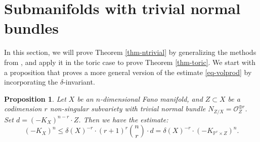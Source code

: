 \documentclass[12pt]{amsart}
\newtheorem{thm}{Theorem}[section]
\newtheorem{prop}[thm]{Proposition}
\theoremstyle{definition}
\newcommand{\IP}{{\mathbb P}}
\newcommand{\CO}{{\mathcal O}}
\newcommand{\lee}{\leqslant}
\begin{document}
\section{Submanifolds with trivial normal bundles}\label{sec-ntrivial}


In this section, we will prove Theorem \ref{thm-ntrivial} by generalizing the methods from \cite{Fuj18, LZ18}, and apply it in the toric case to prove Theorem \ref{thm-toric}.
We start with a proposition that proves a more general version of the estimate \eqref{eq-volprod} by incorporating the $\delta$-invariant. 
\begin{prop}\label{prop:Ntrivial}
    Let $X$ be an $n$-dimensional Fano manifold, and $Z\subset X$ be a codimension $r$ non-singular subvariety with trivial normal bundle $N_{Z/X}=\CO_{Z}^{\oplus r}$. Set $d = (-K_X)^{n-r}\cdot Z$. Then we have the estimate:
    $$
    (-K_X)^n \lee \delta(X)^{-r}\cdot(r+1)^r\binom{n}{r}\cdot d=\delta(X)^{-r}\cdot( -K_{\IP^r\times Z})^n.
    $$  
\end{prop}
\end{document}
